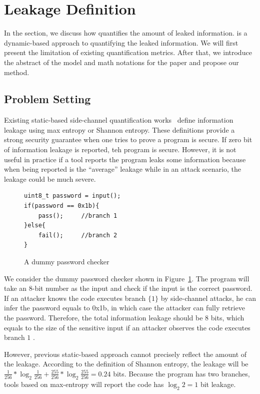 \section{\tool{} Leakage Definition}
\label{trace_qif}
In the section, we discuss how \tool{} quantifies the amount of
leaked information. \tool{} is a dynamic-based approach to 
quantifying the leaked information. We will first present 
the limitation of existing quantification metrics. After
that, we introduce the abstract of the model and math notations 
for the paper and propose our method.

\subsection{Problem Setting}
Existing static-based side-channel quantification works~\cite{182946,Wichelmann:2018:MFF:3274694.3274741 } define information leakage
using max entropy or Shannon entropy. These definitions provide a strong security guarantee
when one tries to prove a program is secure.  If zero bit of information leakage is reported, teh program is secure. However, it is not useful in practice if a tool reports
the program leaks
some information because when being reported is the ``average'' leakage while in an attack
scenario, the leakage could be much severe.


\begin{figure}[h!]
    \centering
\begin{lstlisting}[xleftmargin=.03\textwidth,xrightmargin=.01\textwidth]
uint8_t password = input();
if(password == 0x1b){
    pass();     //branch 1
}else{
    fail();     //branch 2
}
\end{lstlisting}
\caption{A dummy password checker}
\label{figure:password checker}
\end{figure}

We consider the dummy password checker shown in Figure~\ref{figure:password checker}.
The program will take an 8-bit number as the input and check if the input is the
correct password. 
If an attacker knows the
code executes branch $\{{1\}}$ by side-channel attacks, he can infer the password equals to 0x1b,
in which case the attacker can fully retrieve the password.
Therefore, the total information leakage should be 8 bits, which equals to the size
of the sensitive input if an attacker observes the code executes branch $1$ . 

However, previous static-based approach cannot precisely reflect the amount of the leakage.
According to the definition of Shannon entropy, the leakage will be $\frac{1}{256}*\log_{2}\frac{1}{256} + 
\frac{255}{256} *\log_{2}\frac{255}{256}= 0.24$ bits. Because the program has two branches, tools
based on max-entropy will report the code has $\log_2{2} = 1$ bit leakage.

